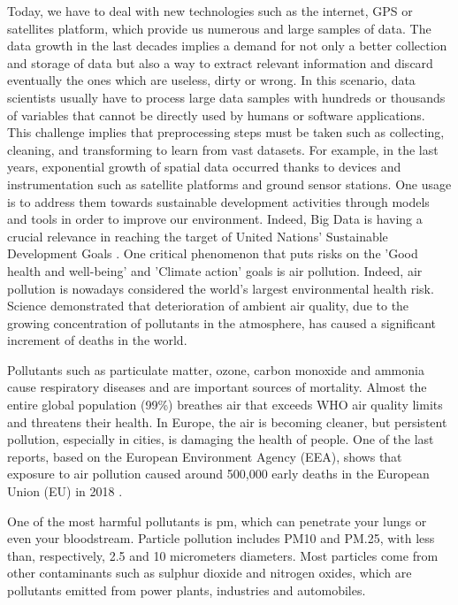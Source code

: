 Today, we have to deal with new technologies such as the internet, GPS or satellites platform, which provide us numerous and large samples of data. The data growth in the last decades implies a demand for not only a better collection and storage of data but also a way to extract relevant information and discard eventually the ones which are useless, dirty or wrong.
In this scenario, data scientists usually have to process large data samples with hundreds or thousands of variables that \cite{garcia2016big} cannot be directly used by humans or software applications.
This challenge implies that preprocessing steps must be taken such as collecting, cleaning, and transforming to learn from vast datasets.
For example, in the last years, exponential growth of spatial data occurred thanks to devices and instrumentation such as satellite platforms and ground sensor stations. 
One usage is to address them towards sustainable development activities through models and tools in order to improve our environment. Indeed, Big Data is having a crucial relevance in reaching the target of United Nations’ Sustainable Development Goals \cite{zhang2019orchestrating}.
One critical phenomenon that puts risks on the 'Good health and well-being' and 'Climate action' goals is air pollution.
Indeed, air pollution is nowadays considered the world's largest environmental health risk.\\
Science demonstrated that deterioration of ambient air quality, due to the growing concentration of pollutants in the atmosphere, has caused a significant increment of deaths in the world.\par  
Pollutants such as particulate matter, ozone, carbon monoxide and ammonia cause respiratory diseases and are important sources of mortality.
Almost the entire global population (99\%) breathes air that exceeds WHO air quality limits and threatens their health.\newline
In Europe, the air is becoming cleaner, but persistent pollution, especially in cities, is damaging the health of people. One of the last reports, based on the European Environment Agency (EEA), shows that exposure to air pollution caused around 500,000 early deaths in the European Union (EU) in 2018 \cite{european2018air}.\par
One of the most harmful pollutants is \gls{pm}, which can penetrate your lungs or even your bloodstream.\newline 
Particle pollution includes PM10 and PM.25, with less than, respectively, 2.5 and 10 micrometers diameters.
Most particles come from other contaminants such as sulphur dioxide and nitrogen oxides, which are pollutants emitted from power plants, industries and automobiles.\par
